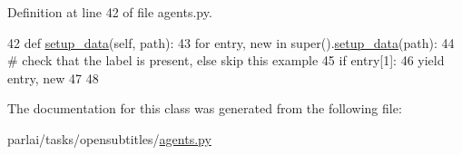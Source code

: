 Definition at line 42 of file agents.\+py.


\begin{DoxyCode}
42     \textcolor{keyword}{def }\hyperlink{namespaceparlai_1_1tasks_1_1multinli_1_1agents_a4fa2cb0ba1ed745336ad8bceed36b841}{setup\_data}(self, path):
43         \textcolor{keywordflow}{for} entry, new \textcolor{keywordflow}{in} super().\hyperlink{namespaceparlai_1_1tasks_1_1multinli_1_1agents_a4fa2cb0ba1ed745336ad8bceed36b841}{setup\_data}(path):
44             \textcolor{comment}{# check that the label is present, else skip this example}
45             \textcolor{keywordflow}{if} entry[1]:
46                 \textcolor{keywordflow}{yield} entry, new
47 
48 
\end{DoxyCode}


The documentation for this class was generated from the following file\+:\begin{DoxyCompactItemize}
\item 
parlai/tasks/opensubtitles/\hyperlink{parlai_2tasks_2opensubtitles_2agents_8py}{agents.\+py}\end{DoxyCompactItemize}
